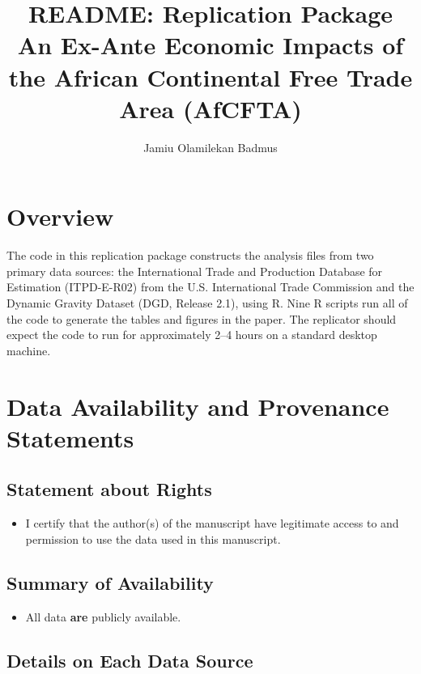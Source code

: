\documentclass[12pt]{article}
\title{\textbf{README: Replication Package} \\ \textbf{An Ex-Ante Economic Impacts of the African Continental Free Trade Area (AfCFTA)}}
\author{Jamiu Olamilekan Badmus}
\date{}
\begin{document}
\maketitle

\section{Overview}

The code in this replication package constructs the analysis files from two primary data sources: the International Trade and Production Database for Estimation (ITPD-E-R02) from the U.S. International Trade Commission and the Dynamic Gravity Dataset (DGD, Release 2.1), using R. Nine R scripts run all of the code to generate the tables and figures in the paper. The replicator should expect the code to run for approximately 2--4 hours on a standard desktop machine.

\section{Data Availability and Provenance Statements}

\subsection{Statement about Rights}

\begin{itemize}
	\item[\rlap{\raisebox{0.3ex}{\hspace{0.4ex}\tiny \ding{52}}}$\square$] I certify that the author(s) of the manuscript have legitimate access to and permission to use the data used in this manuscript.
\end{itemize}

\subsection{Summary of Availability}

\begin{itemize}
	\item[\rlap{\raisebox{0.3ex}{\hspace{0.4ex}\tiny \ding{52}}}$\square$] All data \textbf{are} publicly available.
\end{itemize}

\subsection{Details on Each Data Source}
\end{document}
